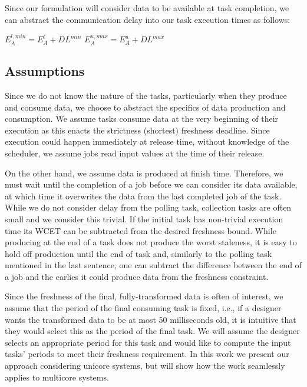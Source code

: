 Since our formulation will consider data to be available at task completion, we can abstract the communication delay into our task execution times as follows:

\begin{center}
		$E^{l,min}_A = E^l_A + DL^{min}$  $E^{u,max}_A = E^u_A + DL^{max}$
\end{center}

\subsection{Assumptions}

Since we do not know the nature of the tasks, particularly when they produce and consume data, we choose to abstract the specifics of data production and consumption. We assume tasks consume data at the very beginning of their execution as this enacts the strictness (shortest) freshness deadline. Since execution could happen immediately at release time, without knowledge of the scheduler, we assume jobs read input values at the time of their release.

On the other hand, we assume data is produced at finish time. Therefore, we must wait until the completion of a job before we can consider its data available, at which time it overwrites the data from the last completed job of the task. While we do not consider delay from the polling task, collection tasks are often small and we consider this trivial. If the initial task has non-trivial execution time its WCET can be subtracted from the desired freshness bound. While producing at the end of a task does not produce the worst staleness, it is easy to hold off production until the end of task and, similarly to the polling task mentioned in the last sentence, one can subtract the difference between the end of a job and the earlies it could produce data from the freshness constraint.

Since the freshness of the final, fully-transformed data is often of interest, we assume that the period of the final consuming task is fixed, i.e., if a designer wants the transformed data to be at most 50 milliseconds old, it is intuitive that they would select this as the period of the final task. We will assume the designer selects an appropriate period for this task and would like to compute the input tasks' periods to meet their freshness requirement. In this work we present our approach considering unicore systems, but will show how the work seamlessly applies to multicore systems.

